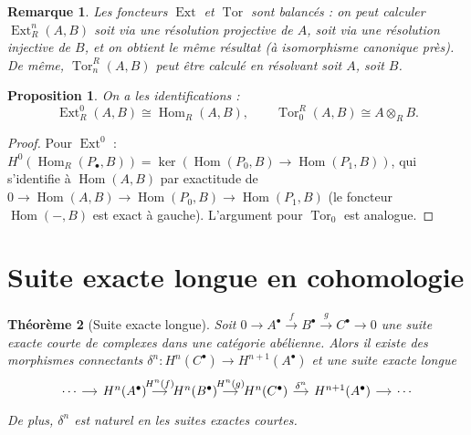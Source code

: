 \documentclass[a4paper,12pt]{book}
\DeclareMathOperator{\Hom}{Hom}
\newtheorem{theoreme}{Théorème}[chapter]
\newtheorem{proposition}[theoreme]{Proposition}
\newtheorem*{remarque}{Remarque}
\begin{document}
\begin{remarque}\label{rem:ext-tor-balanced}
Les foncteurs $\operatorname{Ext}$ et $\operatorname{Tor}$ sont
\emph{balancés} : on peut calculer $\operatorname{Ext}_R^n(A, B)$
soit via une résolution projective de $A$, soit via une résolution
injective de $B$, et on obtient le même résultat (à isomorphisme
canonique près). De même, $\operatorname{Tor}_n^R(A, B)$ peut être
calculé en résolvant soit $A$, soit $B$.
\end{remarque}

\begin{proposition}\label{prop:ext0-tor0}
On a les identifications :
\[
  \operatorname{Ext}_R^0(A, B) \cong \Hom_R(A, B), \qquad
  \operatorname{Tor}_0^R(A, B) \cong A \otimes_R B.
\]
\end{proposition}

\begin{proof}
Pour $\operatorname{Ext}^0$ : $H^0(\Hom_R(P_\bullet, B))
= \ker(\Hom(P_0, B) \to \Hom(P_1, B))$, qui s'identifie
à $\Hom(A, B)$ par exactitude de
$0 \to \Hom(A, B) \to \Hom(P_0, B) \to \Hom(P_1, B)$
(le foncteur $\Hom(-, B)$ est exact à gauche).
L'argument pour $\operatorname{Tor}_0$ est analogue.
\end{proof}


\section{Suite exacte longue en cohomologie}\label{sec:long-exact}

\begin{theoreme}[Suite exacte longue]\label{thm:long-exact-sequence}
Soit $0 \to A^\bullet \xrightarrow{f} B^\bullet \xrightarrow{g} C^\bullet \to 0$
une suite exacte courte de complexes dans une catégorie abélienne. Alors
il existe des morphismes connectants
$\delta^n \colon H^n(C^\bullet) \to H^{n+1}(A^\bullet)$ et une suite
exacte longue
\[
\begin{tikzcd}[column sep=small]
\cdots \arrow[r]
& H^n(A^\bullet) \arrow[r, "H^n(f)"]
& H^n(B^\bullet) \arrow[r, "H^n(g)"]
& H^n(C^\bullet) \arrow[r, "\delta^n"]
& H^{n+1}(A^\bullet) \arrow[r]
& \cdots
\end{tikzcd}
\]
De plus, $\delta^n$ est naturel en les suites exactes courtes.
\end{theoreme}
\end{document}
